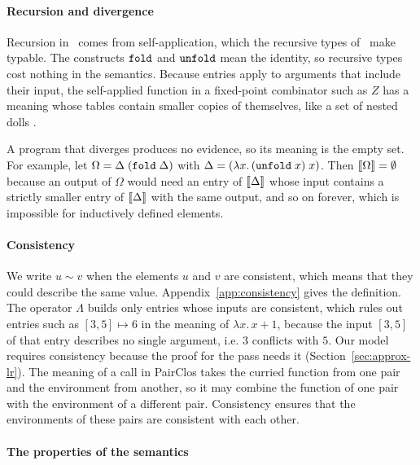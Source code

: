 \paragraph{Recursion and divergence}

Recursion in \fpc\ comes from self-application, which the recursive
types of \fpc\ make typable. The constructs $\mathtt{fold}$ and
$\mathtt{unfold}$ mean the identity, so recursive types cost nothing in
the semantics. Because entries apply to arguments that include their
input, the self-applied function in a fixed-point combinator such as
$Z$ has a meaning whose tables contain smaller copies of themselves,
like a set of nested dolls \citep{Siek:2017ab}.

A program that diverges produces no evidence, so its meaning is the
empty set. For example, let $\Omega = \Delta\;(\mathtt{fold}\;\Delta)$
with $\Delta = (\lambda x.\, (\mathtt{unfold}\;x)\; x)$. Then $\llbracket \Omega \rrbracket
= \emptyset$ because an output of $\Omega$ would need an entry of
$\llbracket \Delta \rrbracket$ whose input contains a strictly smaller entry of
$\llbracket \Delta \rrbracket$ with the same output, and so on forever, which is
impossible for inductively defined elements.


\paragraph{Consistency}

We write $u \sim v$ when the elements $u$ and $v$ are consistent,
which means that they could describe the same
value. Appendix~\ref{app:consistency} gives the definition. The
operator $\Lambda$ builds only entries whose inputs are consistent,
which rules out entries such as $[3, 5] \mapsto 6$ in the meaning of
$\lambda x.\, x + 1$, because the input $[3, 5]$ of that entry
describes no single argument, i.e. $3$ conflicts with $5$.
%
Our model requires consistency because the proof for the  pass needs it (Section~\ref{sec:approx-lr}). The meaning of a call in PairClos takes
the curried function from one pair and the environment from another,
so it may combine the function of one pair with the environment of a
different pair. Consistency ensures that the
environments of these pairs are consistent with each other.


\paragraph{The properties of the semantics}

